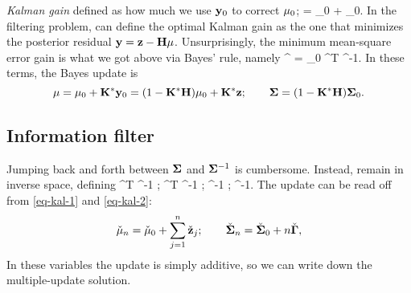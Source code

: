 \documentclass[notitlepage,openany,11pt]{report}
\numberwithin{equation}{section}
\theoremstyle{plain}%
\begin{document}
\emph{Kalman gain} defined as how much we use $\mathbf{y}_0$ to correct $\mathbf{\mu}_{0}$;
\be
\mbf{\mu} = \mbf{\mu}_{0} +  _0.
\ee
In the filtering problem, can define the optimal Kalman gain as the one that minimizes the posterior residual $\mathbf{y} = \mathbf{z} - \mathbf{H} \mathbf{\mu}$. Unsurprisingly, the minimum mean-square error gain is what we got above via Bayes' rule, namely
\be
{}^{\ast} = \mbf{\Sigma}_0 ^{T} ^{-1}.
\ee
In these terms, the Bayes update is
\begin{equation}
\mathbf{\mu} = \mathbf{\mu}_0 + \mathbf{K}^{\ast} \mathbf{y}_0 = (1 - \mathbf{K}^{\ast} \mathbf{H})\mathbf{\mu}_0 + \mathbf{K}^{\ast}\mathbf{z}; \qquad \mathbf{\Sigma} = (1 - \mathbf{K}^{\ast} \mathbf{H}) \mathbf{\Sigma}_0.
\end{equation}

%
%
%


\subsection{Information filter}

Jumping back and forth between $\mathbf{\Sigma}$ and $\mathbf{\Sigma}^{-1}$ is cumbersome. Instead, remain in inverse space, defining
\be
\check{\mbf{\Gamma}} \equiv {}^{T} \mbf{\Gamma}^{-1} ; \qquad {} \equiv {}^{T} \mbf{\Gamma}^{-1} ; 
\qquad \check{\mbf{\mu}} \equiv \mbf{\Sigma}^{-1} \mbf \mu; \qquad \check{\mbf{\Sigma}} \equiv \mbf{\Sigma}^{-1}. 
\ee
The update can be read off from \eqref{eq-kal-1} and \eqref{eq-kal-2}:
\begin{equation}
\check{\mathbf{\mu}}_{n} = \check{\mathbf{\mu}}_{0} + \sum_{j=1}^{n} \check{\mathbf{z}}_j; \qquad \check{\mathbf{\Sigma}}_n = \check{\mathbf{\Sigma}}_0 + n \check{\mathbf{\Gamma}},
\end{equation}
In these variables the update is simply additive, so we can write down the multiple-update solution.
\end{document}
